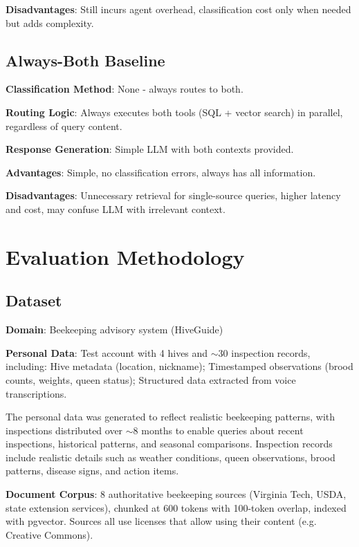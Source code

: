 \documentclass[twocolumn,10pt]{article}
\begin{document}
\textbf{Disadvantages}: Still incurs agent overhead, classification cost only when needed but adds complexity.

\subsection{Always-Both Baseline}

\textbf{Classification Method}: None - always routes to both.

\textbf{Routing Logic}: Always executes both tools (SQL + vector search) in parallel, regardless of query content.

\textbf{Response Generation}: Simple LLM with both contexts provided.

\textbf{Advantages}: Simple, no classification errors, always has all information.

\textbf{Disadvantages}: Unnecessary retrieval for single-source queries, higher latency and cost, may confuse LLM with irrelevant context.

\section{Evaluation Methodology}

\subsection{Dataset}

\textbf{Domain}: Beekeeping advisory system (HiveGuide)

\textbf{Personal Data}: Test account with 4 hives and $\sim$30 inspection records, including: Hive metadata (location, nickname); Timestamped observations (brood counts, weights, queen status); Structured data extracted from voice transcriptions.

The personal data was generated to reflect realistic beekeeping patterns, with inspections distributed over $\sim$8 months to enable queries about recent inspections, historical patterns, and seasonal comparisons. Inspection records include realistic details such as weather conditions, queen observations, brood patterns, disease signs, and action items.

\textbf{Document Corpus}: 8 authoritative beekeeping sources (Virginia Tech, USDA, state extension services), chunked at 600 tokens with 100-token overlap, indexed with pgvector. Sources all use licenses that allow using their content (e.g. Creative Commons).
\end{document}
